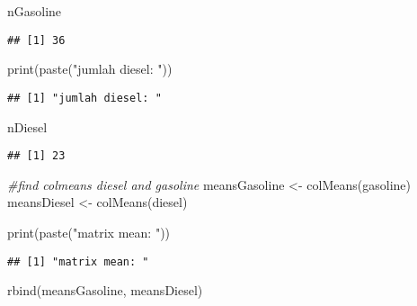 \documentclass[
]{article}
\newenvironment{Shaded}{\begin{snugshade}}{\end{snugshade}}
\newcommand{\CommentTok}[1]{\textcolor[rgb]{0.56,0.35,0.01}{\textit{#1}}}
\newcommand{\FunctionTok}[1]{\textcolor[rgb]{0.00,0.00,0.00}{#1}}
\newcommand{\NormalTok}[1]{#1}
\newcommand{\OtherTok}[1]{\textcolor[rgb]{0.56,0.35,0.01}{#1}}
\newcommand{\StringTok}[1]{\textcolor[rgb]{0.31,0.60,0.02}{#1}}
\begin{document}
\begin{Shaded}
\begin{Highlighting}[]
\NormalTok{nGasoline}
\end{Highlighting}
\end{Shaded}

\begin{verbatim}
## [1] 36
\end{verbatim}

\begin{Shaded}
\begin{Highlighting}[]
\FunctionTok{print}\NormalTok{(}\FunctionTok{paste}\NormalTok{(}\StringTok{"jumlah diesel: "}\NormalTok{))}
\end{Highlighting}
\end{Shaded}

\begin{verbatim}
## [1] "jumlah diesel: "
\end{verbatim}

\begin{Shaded}
\begin{Highlighting}[]
\NormalTok{nDiesel}
\end{Highlighting}
\end{Shaded}

\begin{verbatim}
## [1] 23
\end{verbatim}

\begin{Shaded}
\begin{Highlighting}[]
\CommentTok{\#find colmeans diesel and gasoline}
\NormalTok{meansGasoline }\OtherTok{\textless{}{-}} \FunctionTok{colMeans}\NormalTok{(gasoline)}
\NormalTok{meansDiesel }\OtherTok{\textless{}{-}} \FunctionTok{colMeans}\NormalTok{(diesel)}

\FunctionTok{print}\NormalTok{(}\FunctionTok{paste}\NormalTok{(}\StringTok{"matrix mean: "}\NormalTok{))}
\end{Highlighting}
\end{Shaded}

\begin{verbatim}
## [1] "matrix mean: "
\end{verbatim}

\begin{Shaded}
\begin{Highlighting}[]
\FunctionTok{rbind}\NormalTok{(meansGasoline, meansDiesel)}
\end{Highlighting}
\end{Shaded}
\end{document}
